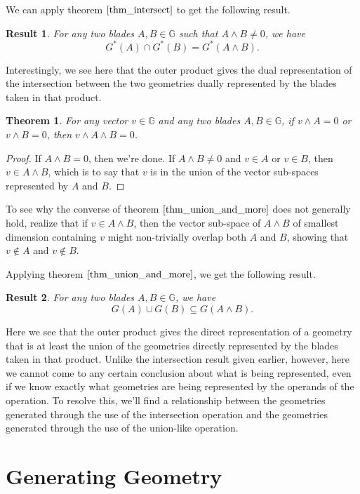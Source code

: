 \documentclass[12pt]{article}
\newcommand{\G}{\mathbb{G}}
\newtheorem{theorem}{Theorem}[section]
\newtheorem{result}{Result}[section]
\begin{document}
We can apply theorem $\eqref{thm_intersect}$ to get the following result.
\begin{result}\label{rslt_intersect}
For any two blades $A,B\in\G$ such that $A\wedge B\neq 0$, we have
\begin{equation*}
G^*(A)\cap G^*(B) = G^*(A\wedge B).
\end{equation*}
\end{result}
Interestingly, we see here that the outer product gives the
dual representation of the intersection between the two geometries
dually represented by the blades taken in that product.
\begin{theorem}\label{thm_union_and_more}
For any vector $v\in\G$ and any two blades $A,B\in\G$,
if $v\wedge A=0$ or $v\wedge B=0$, then $v\wedge A\wedge B=0$.
\end{theorem}
\begin{proof}
If $A\wedge B=0$, then we're done.  If $A\wedge B\neq 0$ and $v\in A$ or $v\in B$,
then $v\in A\wedge B$, which is to say that $v$ is in the union of the vector sub-spaces
represented by $A$ and $B$.
\end{proof}
To see why the converse of theorem $\eqref{thm_union_and_more}$ does not generally hold,
realize that if $v\in A\wedge B$, then the vector sub-space of $A\wedge B$ of smallest dimension
containing $v$ might non-trivially overlap both $A$ and $B$, showing that $v\not\in A$ and
$v\not\in B$.

Applying theorem $\eqref{thm_union_and_more}$, we get the following result.
\begin{result}\label{rslt_union_and_more}
For any two blades $A,B\in\G$, we have
\begin{equation*}
G(A)\cup G(B)\subseteq G(A\wedge B).
\end{equation*}
\end{result}
Here we see that the outer product gives the direct representation
of a geometry that is at least the union of the geometries directly
represented by the blades taken in that product.  Unlike the intersection
result given earlier, however, here we cannot come to any certain conclusion
about what is being represented, even if we know exactly what
geometries are being represented by the operands of the operation.
To resolve this, we'll find a relationship between the geometries
generated through the use of the intersection operation and the geometries
generated through the use of the union-like operation.

\section{Generating Geometry}
\end{document}
